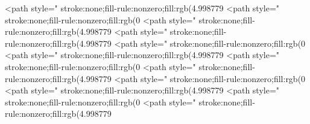 <path style=" stroke:none;fill-rule:nonzero;fill:rgb(4.998779%
<path style=" stroke:none;fill-rule:nonzero;fill:rgb(0%
<path style=" stroke:none;fill-rule:nonzero;fill:rgb(4.998779%
<path style=" stroke:none;fill-rule:nonzero;fill:rgb(4.998779%
<path style=" stroke:none;fill-rule:nonzero;fill:rgb(0%
<path style=" stroke:none;fill-rule:nonzero;fill:rgb(4.998779%
<path style=" stroke:none;fill-rule:nonzero;fill:rgb(0%
<path style=" stroke:none;fill-rule:nonzero;fill:rgb(4.998779%
<path style=" stroke:none;fill-rule:nonzero;fill:rgb(0%
<path style=" stroke:none;fill-rule:nonzero;fill:rgb(4.998779%
<path style=" stroke:none;fill-rule:nonzero;fill:rgb(0%
<path style=" stroke:none;fill-rule:nonzero;fill:rgb(4.998779%
